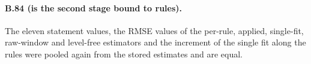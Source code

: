 \documentclass[11pt,a4paper]{article}
\begin{document}
\paragraph{B.84 (is the second stage bound to rules).} The eleven statement values, the
RMSE values of the per-rule, applied, single-fit, raw-window and level-free estimators and
the increment of the single fit along the rules were pooled again from the stored
estimates and are equal.

\FloatBarrier


\end{document}
